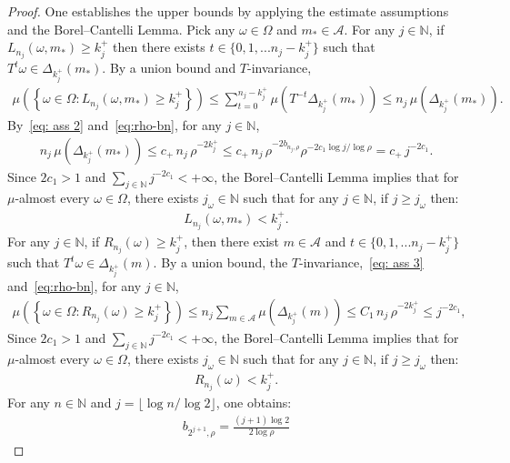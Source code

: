 \documentclass[12pt,reqno]{amsart}
\theoremstyle{definition}
\theoremstyle{plain}
\begin{document}
\begin{proof}
One establishes the upper bounds by applying the estimate assumptions and the Borel--Cantelli Lemma. Pick any $\omega\in\Omega$ and $m_*\in\mathcal{A}$. For any $j\in\mathbb{N}$, if $L_{n_j}(\omega,m_*)\geq k^+_j$ then there exists $t\in\{0,1,...n_j-k^+_j\}$ such that $T^t\omega\in\Delta_{k^+_j}{\left({m_*}\right)}$. By a union bound and $T$-invariance,
\begin{align*}
    \mu{\left(\left\{\omega\in\Omega:L_{n_j}(\omega,m_*)\geq k^+_j\right\}\right)}
    \leq \sum_{t=0}^{n_j-k^+_j}\mu{\left (T^{-t}\Delta_{k^+_j}{\left({m_*}\right)}\right)}
    \leq n_j\,\mu{\left(\Delta_{k^+_j}{\left({m_*}\right)}\right)}.
\end{align*}
By~\eqref{eq: ass 2} and~\eqref{eq:rho-bn}, for any $j\in\mathbb{N}$,
\begin{align*}
    n_j\,\mu{\left(\Delta_{k^+_j}{\left({m_*}\right)}\right)}
    \leq c_+\,n_j\,\rho^{-2k^+_j}
    \leq c_+\,n_j\,\rho^{-2b_{n_j,\rho}}\rho^{-2c_1\log{j}/\log{\rho}}
    = c_+\,j^{-2c_1}.
\end{align*}
Since $2c_1>1$ and $\sum_{j\in\mathbb{N}}j^{-2c_1}<+\infty$, the Borel--Cantelli Lemma implies that for $\mu$-almost every $\omega\in\Omega$, there exists $j_\omega\in\mathbb{N}$ such that for any $j\in\mathbb{N}$, if $j\geq j_\omega$ then:
\begin{align*}
     L_{n_j}(\omega,m_*)<k^+_j.
\end{align*}
For any $j\in\mathbb{N}$, if $R_{n_j}(\omega)\geq k^+_j$, then there exist $m\in\mathcal{A}$ and $t\in\{0,1,...n_j-k^+_j\}$ such that $T^t\omega\in\Delta_{k^+_j}{\left({m}\right)}$. By a union bound, the $T$-invariance,~\eqref{eq: ass 3} and~\eqref{eq:rho-bn}, for any $j\in\mathbb{N}$,
\begin{align*}
    \mu{\left(\left\{\omega\in\Omega:R_{n_j}(\omega)\geq k^+_j\right\}\right)}
    \leq n_j\sum_{m\in\mathcal{A}}\mu{\left(\Delta_{k^+_j}{\left(m\right)}\right)}
    \leq C_1\,n_j\,\rho^{-2k^+_j}
    \leq j^{-2c_1},
\end{align*}
Since $2c_1>1$ and $\sum_{j\in\mathbb{N}}j^{-2c_1}<+\infty$, the Borel--Cantelli Lemma implies that for $\mu$-almost every $\omega\in\Omega$, there exists $j_\omega\in\mathbb{N}$ such that for any $j\in\mathbb{N}$, if $j\geq j_\omega$ then:
\begin{align*}
     R_{n_j}(\omega)<k^+_j.
\end{align*}
For any $n\in\mathbb{N}$ and $j=\lfloor \log{n}/\log{2} \rfloor$, one obtains:
\begin{align*}
    b_{2^{j+1},\rho}=\frac{(j+1)\log2}{2\log\rho}

\end{align*}
\end{proof}
\end{document}
